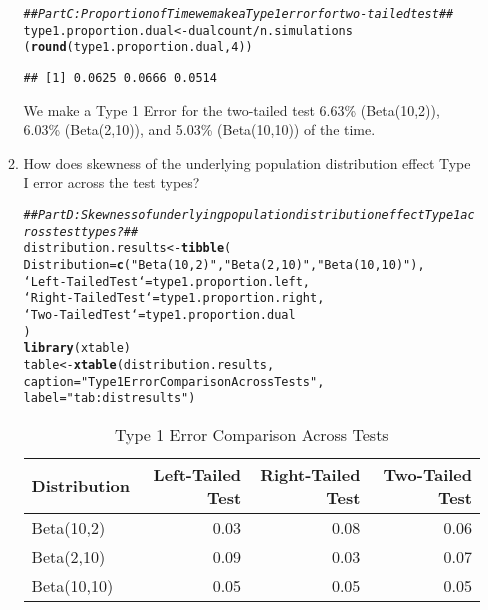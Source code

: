 \documentclass{article}\usepackage[]{graphicx}\usepackage[]{xcolor}
\makeatletter
\newcommand{\hlnum}[1]{\textcolor[rgb]{0.686,0.059,0.569}{#1}}%
\newcommand{\hlsng}[1]{\textcolor[rgb]{0.192,0.494,0.8}{#1}}%
\newcommand{\hlcom}[1]{\textcolor[rgb]{0.678,0.584,0.686}{\textit{#1}}}%
\newcommand{\hlopt}[1]{\textcolor[rgb]{0,0,0}{#1}}%
\newcommand{\hldef}[1]{\textcolor[rgb]{0.345,0.345,0.345}{#1}}%
\newcommand{\hlkwb}[1]{\textcolor[rgb]{0.69,0.353,0.396}{#1}}%
\newcommand{\hlkwc}[1]{\textcolor[rgb]{0.333,0.667,0.333}{#1}}%
\newcommand{\hlkwd}[1]{\textcolor[rgb]{0.737,0.353,0.396}{\textbf{#1}}}%
\newenvironment{kframe}{%
 \def\at@end@of@kframe{}%
 \ifinner\ifhmode%
  \def\at@end@of@kframe{\end{minipage}}%
  \begin{minipage}{\columnwidth}%
 \fi\fi%
 \def\FrameCommand##1{\hskip\@totalleftmargin \hskip-\fboxsep
 \colorbox{shadecolor}{##1}\hskip-\fboxsep
     \hskip-\linewidth \hskip-\@totalleftmargin \hskip\columnwidth}%
 \MakeFramed {\advance\hsize-\width
   \@totalleftmargin\z@ \linewidth\hsize
   \@setminipage}}%
 {\par\unskip\endMakeFramed%
 \at@end@of@kframe}
\newenvironment{knitrout}{}{} %
\makeatother
\begin{document}
\begin{enumerate}
\begin{enumerate}
\begin{knitrout}
\begin{kframe}
\begin{alltt}
\hlcom{## Part C: Proportion of Time we make a Type 1 error for two-tailed test ##}
\hldef{type1.proportion.dual} \hlkwb{<-} \hldef{dualcount}\hlopt{/}\hldef{n.simulations}
\hldef{(}\hlkwd{round}\hldef{(type1.proportion.dual,} \hlnum{4}\hldef{))}
\end{alltt}
\begin{verbatim}
## [1] 0.0625 0.0666 0.0514
\end{verbatim}
\end{kframe}
\end{knitrout}
We make a Type 1 Error for the two-tailed test 6.63\% (Beta(10,2)), 6.03\% (Beta(2,10)), and 5.03\% (Beta(10,10)) of the time.
    \item How does skewness of the underlying population distribution effect
    Type I error across the test types?
\begin{knitrout}
\color{fgcolor}\begin{kframe}
\begin{alltt}
\hlcom{## Part D: Skewness of underlying population distribution effect Type 1 across test types? ##}
\hldef{distribution.results} \hlkwb{<-} \hlkwd{tibble}\hldef{(}
  \hlkwc{Distribution} \hldef{=} \hlkwd{c}\hldef{(}\hlsng{"Beta(10,2)"}\hldef{,} \hlsng{"Beta(2,10)"}\hldef{,} \hlsng{"Beta(10,10)"}\hldef{),}
  \hlkwc{`Left-Tailed Test`} \hldef{= type1.proportion.left,}
  \hlkwc{`Right-Tailed Test`} \hldef{= type1.proportion.right,}
  \hlkwc{`Two-Tailed Test`} \hldef{= type1.proportion.dual}
\hldef{)}
\hlkwd{library}\hldef{(xtable)}
\hldef{table} \hlkwb{<-} \hlkwd{xtable}\hldef{(distribution.results,}
                \hlkwc{caption} \hldef{=} \hlsng{"Type 1 Error Comparison Across Tests"}\hldef{,}
                \hlkwc{label} \hldef{=} \hlsng{"tab:distresults"}\hldef{)}
\end{alltt}
\end{kframe}
\end{knitrout}
\begin{table}[H]
\centering
\begingroup\small
\begin{tabular}{lrrr}
  \hline
Distribution & Left-Tailed Test & Right-Tailed Test & Two-Tailed Test \\ 
  \hline
Beta(10,2) & 0.03 & 0.08 & 0.06 \\ 
  Beta(2,10) & 0.09 & 0.03 & 0.07 \\ 
  Beta(10,10) & 0.05 & 0.05 & 0.05 \\ 
   \hline
\end{tabular}
\endgroup
\caption{Type 1 Error Comparison Across Tests} 
\label{tab:distresults}
\end{table}


\end{enumerate}
\end{enumerate}
\end{document}
